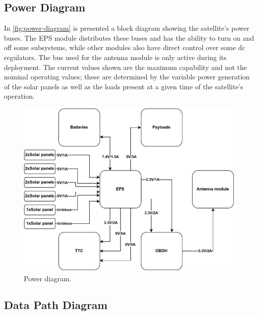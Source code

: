 \subsection{Power Diagram}

In \autoref{fig:power-diagram} is presented a block diagram showing the satellite's power buses.
The EPS module distributes these buses and has the ability to turn on and off some subsystems, while other modules also have direct control over some dc regulators\cite{eps2}.
The bus used for the antenna module is only active during its deployment. 
The current values shown are the maximum capability and not the nominal operating values; these are determined by the variable power generation of the solar panels as well as the loads present at a given time of the satellite's operation.

\begin{figure}[!htb]
    \begin{center}
        \includegraphics[width=\textwidth]{figures/power_diagram.pdf}
        \caption{Power diagram.}
        \label{fig:power-diagram}
    \end{center}
\end{figure}


\subsection{Data Path Diagram}

